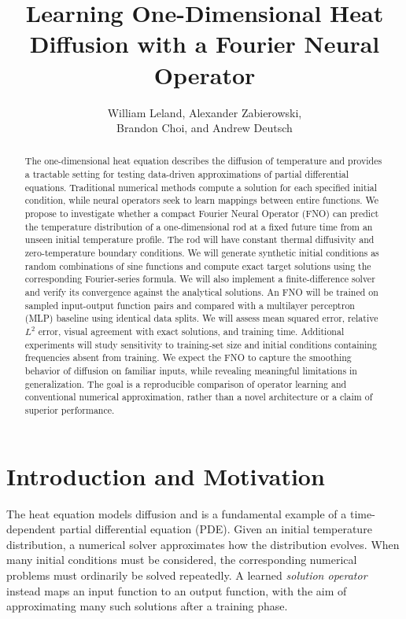 \documentclass{article}
\title{Learning One-Dimensional Heat Diffusion with a Fourier Neural Operator}
\author{William Leland, Alexander Zabierowski,\\ Brandon Choi, and Andrew Deutsch}
\begin{document}
\maketitle

\begin{abstract}
The one-dimensional heat equation describes the diffusion of temperature and provides a tractable setting for testing data-driven approximations of partial differential equations. Traditional numerical methods compute a solution for each specified initial condition, while neural operators seek to learn mappings between entire functions. We propose to investigate whether a compact Fourier Neural Operator (FNO) can predict the temperature distribution of a one-dimensional rod at a fixed future time from an unseen initial temperature profile. The rod will have constant thermal diffusivity and zero-temperature boundary conditions. We will generate synthetic initial conditions as random combinations of sine functions and compute exact target solutions using the corresponding Fourier-series formula. We will also implement a finite-difference solver and verify its convergence against the analytical solutions. An FNO will be trained on sampled input-output function pairs and compared with a multilayer perceptron (MLP) baseline using identical data splits. We will assess mean squared error, relative $L^2$ error, visual agreement with exact solutions, and training time. Additional experiments will study sensitivity to training-set size and initial conditions containing frequencies absent from training. We expect the FNO to capture the smoothing behavior of diffusion on familiar inputs, while revealing meaningful limitations in generalization. The goal is a reproducible comparison of operator learning and conventional numerical approximation, rather than a novel architecture or a claim of superior performance.
\end{abstract}

\section{Introduction and Motivation}
The heat equation models diffusion and is a fundamental example of a time-dependent partial differential equation (PDE). Given an initial temperature distribution, a numerical solver approximates how the distribution evolves. When many initial conditions must be considered, the corresponding numerical problems must ordinarily be solved repeatedly. A learned \emph{solution operator} instead maps an input function to an output function, with the aim of approximating many such solutions after a training phase.
\end{document}
